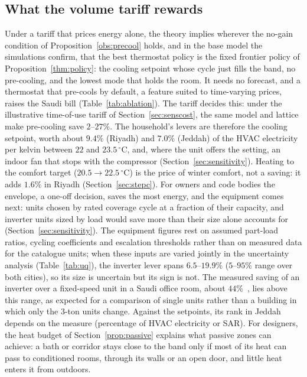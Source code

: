 \documentclass[10pt,a4paper,twocolumn]{article}
\theoremstyle{definition}
\newcommand{\hlTouLo}{2}
\newcommand{\hlTouHi}{27}
\newcommand{\hlSpPerKR}{9.4}
\newcommand{\hlSpHeatR}{1.6}
\newcommand{\hlSpPerKJ}{7.0}
\newcommand{\hlUQInvLo}{6.5}
\newcommand{\hlUQInvHi}{19.9}
\begin{document}
\subsection{What the volume tariff rewards}
Under a tariff that prices energy alone, the theory implies wherever the no-gain condition of Proposition~\ref{obs:precool} holds, and in the base model the simulations confirm, that the best thermostat policy is the fixed frontier policy of Proposition~\ref{thm:policy}: the cooling setpoint whose cycle just fills the band, no pre-cooling, and the lowest mode that holds the room. It needs no forecast, and a thermostat that pre-cools by default, a feature suited to time-varying prices, raises the Saudi bill (Table~\ref{tab:ablation}). The tariff decides this: under the illustrative time-of-use tariff of Section~\ref{sec:senscost}, the same model and lattice make pre-cooling save $\hlTouLo$--$\hlTouHi\%$. The household's levers are therefore the cooling setpoint, worth about $\hlSpPerKR\%$ (Riyadh) and $\hlSpPerKJ\%$ (Jeddah) of the HVAC electricity per kelvin between $22$ and $23.5\,^{\circ}$C, and, where the unit offers the setting, an indoor fan that stops with the compressor (Section~\ref{sec:sensitivity}). Heating to the comfort target ($20.5\to22.5\,^{\circ}$C) is the price of winter comfort, not a saving: it adds $\hlSpHeatR\%$ in Riyadh (Section~\ref{sec:stepc}). For owners and code bodies the envelope, a one-off decision, saves the most energy, and the equipment comes next: units chosen by rated coverage cycle at a fraction of their capacity, and inverter units sized by load would save more than their size alone accounts for (Section~\ref{sec:sensitivity}). The equipment figures rest on assumed part-load ratios, cycling coefficients and escalation thresholds rather than on measured data for the catalogue units; when these inputs are varied jointly in the uncertainty analysis (Table~\ref{tab:uq}), the inverter lever spans $\hlUQInvLo$--$\hlUQInvHi\%$ ($5$--$95\%$ range over both cities), so its size is uncertain but its sign is not. The measured saving of an inverter over a fixed-speed unit in a Saudi office room, about $44\%$~\citep{almogbel2020inverter}, lies above this range, as expected for a comparison of single units rather than a building in which only the 3-ton units change. Against the setpoints, its rank in Jeddah depends on the measure (percentage of HVAC electricity or SAR).
 For designers, the heat budget of Section~\ref{prop:passive} explains what passive zones can achieve: a bath or corridor stays close to the band only if most of its heat can pass to conditioned rooms, through its walls or an open door, and little heat enters it from outdoors.
\end{document}
